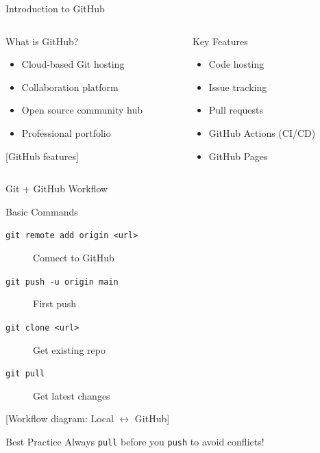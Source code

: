 \documentclass[aspectratio=169]{beamer}
\begin{document}
\begin{frame}{Introduction to GitHub}
  \begin{columns}
    \begin{column}{0.48\textwidth}
      \begin{block}{What is GitHub?}
        \begin{itemize}
          \item Cloud-based Git hosting
          \item Collaboration platform
          \item Open source community hub
          \item Professional portfolio
        \end{itemize}
      \end{block}
      
      \begin{center}
        [GitHub features]
      \end{center}
    \end{column}
    
    \begin{column}{0.48\textwidth}
      \begin{block}{Key Features}
        \begin{itemize}
          \item Code hosting
          \item Issue tracking
          \item Pull requests
          \item GitHub Actions (CI/CD)
          \item GitHub Pages
        \end{itemize}
      \end{block}
    \end{column}
  \end{columns}
\end{frame}

\begin{frame}{Git + GitHub Workflow}
  \begin{block}{Basic Commands}
    \begin{description}
      \item[\texttt{git remote add origin <url>}] Connect to GitHub
      \item[\texttt{git push -u origin main}] First push
      \item[\texttt{git clone <url>}] Get existing repo
      \item[\texttt{git pull}] Get latest changes
    \end{description}
  \end{block}
  
  \vspace{1em}
  \begin{center}
    [Workflow diagram: Local $\leftrightarrow$ GitHub]
  \end{center}
  
  \begin{exampleblock}{Best Practice}
    Always \texttt{pull} before you \texttt{push} to avoid conflicts!
  \end{exampleblock}
\end{frame}
\end{document}
